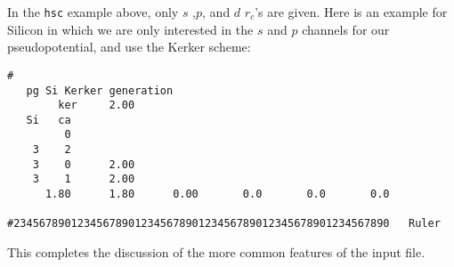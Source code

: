 \documentclass[11pt]{article}
\begin{document}
In the {\tt hsc} example above, only $s$ ,$p$, and $d$ $r_c$'s are
given. Here is an example for Silicon in which we are only interested
in the $s$ and $p$ channels for our pseudopotential, and use the Kerker
scheme:

\begin{verbatim}
#
   pg Si Kerker generation
        ker     2.00
   Si   ca
         0
    3    2
    3    0      2.00
    3    1      2.00
      1.80      1.80      0.00       0.0       0.0       0.0

#23456789012345678901234567890123456789012345678901234567890   Ruler
\end{verbatim}


This completes the discussion of the more common features of the input
file.
\end{document}

